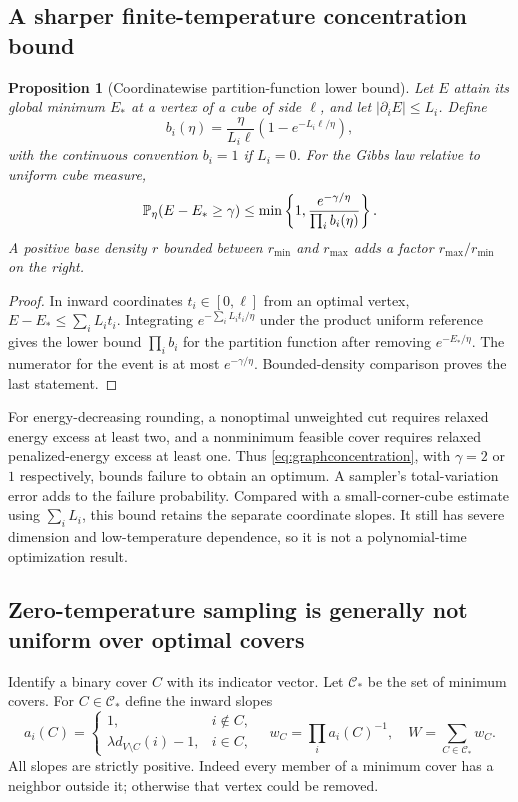 \documentclass[11pt]{article}
\newtheorem{proposition}[theorem]{Proposition}
\theoremstyle{definition}\newtheorem{definition}[theorem]{Definition}
\theoremstyle{remark}\newtheorem{remark}[theorem]{Remark}
\numberwithin{equation}{section}
\newcommand{\1}{\mathbf 1}
\begin{document}
\subsection{A sharper finite-temperature concentration bound}
\begin{proposition}[Coordinatewise partition-function lower bound]\label{prop:graphconcentration}
Let $E$ attain its global minimum $E_*$ at a vertex of a cube of side $\ell$, and let $|\partial_iE|\le L_i$. Define
\[
b_i(\eta)=\frac{\eta}{L_i\ell}(1-e^{-L_i\ell/\eta}),
\]
with the continuous convention $b_i=1$ if $L_i=0$. For the Gibbs law relative to uniform cube measure,
\begin{equation}
\mathbb P_\eta(E-E_*\ge\gamma)\le
\min\left\{1,\frac{e^{-\gamma/\eta}}{\prod_i b_i(\eta)}\right\}.\label{eq:graphconcentration}
\end{equation}
A positive base density $r$ bounded between $r_{\min}$ and $r_{\max}$ adds a factor $r_{\max}/r_{\min}$ on the right.
\end{proposition}
\begin{proof}
In inward coordinates $t_i\in[0,\ell]$ from an optimal vertex, $E-E_*\le\sum_iL_it_i$. Integrating $e^{-\sum_iL_it_i/\eta}$ under the product uniform reference gives the lower bound $\prod_ib_i$ for the partition function after removing $e^{-E_*/\eta}$. The numerator for the event is at most $e^{-\gamma/\eta}$. Bounded-density comparison proves the last statement.
\end{proof}
For energy-decreasing rounding, a nonoptimal unweighted cut requires relaxed energy excess at least two, and a nonminimum feasible cover requires relaxed penalized-energy excess at least one. Thus \eqref{eq:graphconcentration}, with $\gamma=2$ or $1$ respectively, bounds failure to obtain an optimum. A sampler's total-variation error adds to the failure probability. Compared with a small-corner-cube estimate using $\sum_iL_i$, this bound retains the separate coordinate slopes. It still has severe dimension and low-temperature dependence, so it is not a polynomial-time optimization result.

\subsection{Zero-temperature sampling is generally not uniform over optimal covers}
Identify a binary cover $C$ with its indicator vector. Let $\mathcal C_*$ be the set of minimum covers. For $C\in\mathcal C_*$ define the inward slopes
\begin{equation}
a_i(C)=\begin{cases}
1,&i\notin C,\\
\lambda d_{V\setminus C}(i)-1,&i\in C,
\end{cases}
\quad w_C=\prod_i a_i(C)^{-1},\quad W=\sum_{C\in\mathcal C_*}w_C.\label{eq:cornerslopes}
\end{equation}
All slopes are strictly positive. Indeed every member of a minimum cover has a neighbor outside it; otherwise that vertex could be removed.
\end{document}
